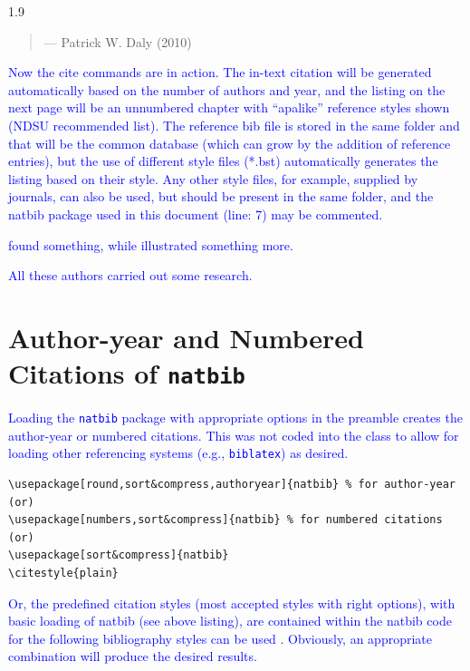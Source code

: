 \documentclass[phd]{ndsu-thesis-2022}
\newcommand\myspacing{1.9} %
\newcommand\italk[1]{\textcolor{blue}{#1}}  %
\begin{document}
\begin{spacing}{\myspacing}
\begin{quote}
\hfill --- Patrick W. Daly (2010)
\end{quote}

\italk{Now the cite commands are in action. The in-text citation will be generated automatically based on the number of authors and year, and the listing on the next page will be an unnumbered chapter with ``apalike'' reference styles shown (NDSU recommended list). The reference bib file is stored in the same folder and that will be the common database (which can grow by the addition of reference entries), but the use of different style files (*.bst) automatically generates the listing based on their style. Any other style files, for example, supplied by journals, can also be used, but should be present in the same folder, and the natbib package used in this document (line: 7) may be commented.}

\italk{\citet{calvo2004using} found something, while \citet{bari2016identification} illustrated something more. }

\italk{All these authors \citep{calvo2004using,cannayen2011latex,bari2016identification,sharma2012ndsu,baczkowski1990ndsu} carried out some research.} 

\section{Author-year and Numbered Citations of \texttt{natbib}}
\italk{Loading the \texttt{natbib} package with appropriate options in the preamble creates the author-year or numbered citations. This was not coded into the class to allow for loading other referencing systems (e.g., \texttt{biblatex}) as desired.}

{\singlespacing
\begin{verbatim}
\usepackage[round,sort&compress,authoryear]{natbib} % for author-year
(or)
\usepackage[numbers,sort&compress]{natbib} % for numbered citations
(or)
\usepackage[sort&compress]{natbib} 
\citestyle{plain}
\end{verbatim}
}

\italk{Or, the predefined citation styles (most accepted styles with right options), with basic loading of natbib (see above listing), are contained within the natbib code for the following bibliography styles can be used \citep{daly2010natural}. Obviously, an appropriate combination will produce the desired results.\\}


\end{spacing}
\end{document}
